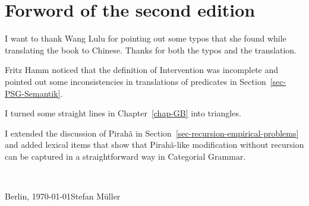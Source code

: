 
\section*{Forword of the second edition}

I want to thank Wang Lulu for pointing out some typos that she found while translating the book to
Chinese. Thanks for both the typos and the translation.

Fritz Hamm noticed that the definition of Intervention was incomplete and pointed out some
inconsistencies in translations of predicates in Section~\ref{sec-PSG-Semantik}.

I turned some straight lines in Chapter~\ref{chap-GB} into triangles.


I extended the discussion of Pirahã in Section~\ref{sec-recursion-empirical-problems} and added lexical items that show that
Pirahã-like modification without recursion can be captured in a straightforward way in Categorial Grammar.

~\medskip

\noindent
Berlin, \today\hfill Stefan Müller



